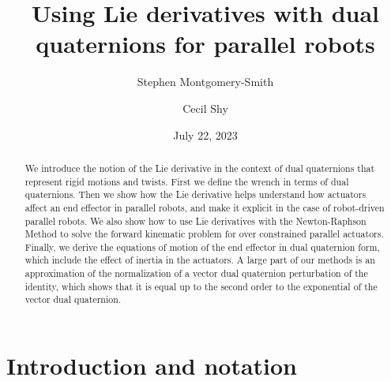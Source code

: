 \documentclass[reqno,12pt]{amsart}
\makeatletter
\def\blfootnote{\gdef\@thefnmark{}\@footnotetext}
\makeatother
\begin{document}
\title[Lie derivatives with dual quaternions for parallel robots]{Using Lie derivatives with dual quaternions for parallel robots}

\author{Stephen Montgomery-Smith}
\address{Department of Mathematics, University of Missouri, Columbia, MO 65211.\\
\rm\url{stephen@missouri.edu}\\
\rm\url{https://stephenmontgomerysmith.github.io}}

\author{Cecil Shy}
\address{Johnson Space Center, 2101 E.~NASA Pkwy, Houston, TX 77058.\\
\rm\url{cecil.shy-1@nasa.gov}}

\date{July 22, 2023}

\begin{abstract}
We introduce the notion of the Lie derivative in the context of dual quaternions that represent rigid motions and twists.  First we define the wrench in terms of dual quaternions.  Then we show how the Lie derivative helps understand how actuators affect an end effector in parallel robots, and make it explicit in the case of robot-driven parallel robots.  We also show how to use Lie derivatives with the Newton-Raphson Method to solve the forward kinematic problem for over constrained parallel actuators.  Finally, we derive the equations of motion of the end effector in dual quaternion form, which include the effect of inertia in the actuators.  A large part of our methods is an approximation of the normalization of a vector dual quaternion perturbation of the identity, which shows that it is equal up to the second order to the exponential of the vector dual quaternion.
\end{abstract}

\maketitle


\section{Introduction and notation}
\end{document}
